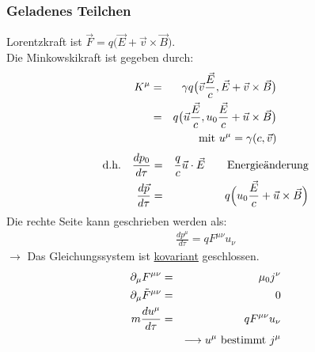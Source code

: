 \subsubsection{Geladenes Teilchen}
Lorentzkraft ist $\vec F = q\big(\vec E + \vec v\times \vec B \big)$.\\
Die Minkowskikraft ist gegeben durch:
\begin{eqnarray*}
K^{\mu} &=& \gamma q \big ( \vec v \frac{\vec E}c, \vec E + \vec v \times \vec B \big)\\
&=& q \big( \vec u \frac{\vec E}c , u_0 \frac{\vec E}c + \vec u \times \vec B\big)\\
&{}&\text{mit }u^{\mu} = \gamma(c,\vec v)
\end{eqnarray*}
\begin{eqnarray*}
\text{d.h.}\quad \frac{dp_0}{d\tau} &=& \frac q c \vec u\cdot\vec E\qquad \text{Energieänderung}\\
\frac{d\vec p}{d\tau} &=& q \Big ( u_0 \frac{\vec E} c + \vec u\times \vec B\Big )
\end{eqnarray*}
Die rechte Seite kann geschrieben werden als:
\begin{eqnarray*}\boxed{\frac{dp^{\mu}}{d\tau} = qF^{\mu\nu}u_{\nu}}\end{eqnarray*}
$\longrightarrow$ Das Gleichungssystem ist \underline{kovariant} geschlossen.
\begin{eqnarray*}
\partial_{\mu} F^{\mu\nu} &=& \mu_0 j^\nu\\
\partial_{\mu}\tilde F^{\mu\nu} &=& 0\\
m\frac{du^{\mu}}{d\tau} &=& q F^{\mu\nu} u_{\nu}\\
&{}&\longrightarrow  u^{\mu} \text{   bestimmt   }j^{\mu}
\end{eqnarray*}

